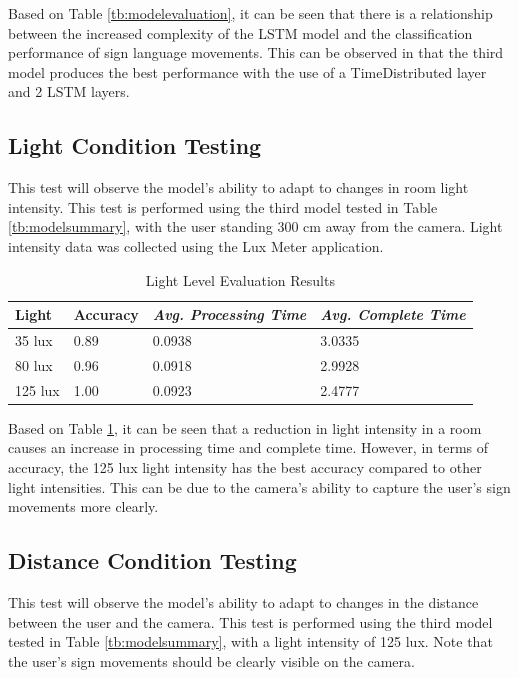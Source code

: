 Based on Table \ref{tb:modelevaluation}, it can be seen that there is a relationship between the increased complexity of the LSTM model and the classification performance of sign language movements. This can be observed in that the third model produces the best performance with the use of a TimeDistributed layer and 2 LSTM layers.

\subsection{Light Condition Testing}
\label{sec:lightanalysis}

This test will observe the model's ability to adapt to changes in room light intensity. This test is performed using the third model tested in Table \ref{tb:modelsummary}, with the user standing 300 cm away from the camera. Light intensity data was collected using the Lux Meter application.

\begin{table}[H]
  \caption{Light Level Evaluation Results}
  \label{tb:lightevaluation}
  \centering
  \begin{tabular}{llll}
    \hline
    \textbf{Light} & \textbf{Accuracy} & \emph{\textbf{Avg. Processing Time}} & \emph{\textbf{Avg. Complete Time}} \\
    \hline
    35 lux & 0.89 & 0.0938 & 3.0335 \\
    80 lux & 0.96 & 0.0918 & 2.9928 \\
    125 lux & 1.00 & 0.0923 & 2.4777 \\
    \hline
  \end{tabular}
\end{table}

Based on Table \ref{tb:lightevaluation}, it can be seen that a reduction in light intensity in a room causes an increase in processing time and complete time. However, in terms of accuracy, the 125 lux light intensity has the best accuracy compared to other light intensities. This can be due to the camera's ability to capture the user's sign movements more clearly.

\subsection{Distance Condition Testing}
\label{sec:distanceanalysis}

This test will observe the model's ability to adapt to changes in the distance between the user and the camera. This test is performed using the third model tested in Table \ref{tb:modelsummary}, with a light intensity of 125 lux. Note that the user's sign movements should be clearly visible on the camera.

